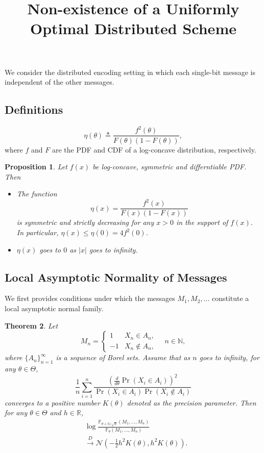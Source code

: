 \documentclass[letterpaper, 10pt]{IEEEtran}      %
\title{\LARGE \bf Non-existence of a Uniformly Optimal Distributed Scheme}
\newtheorem{thm}{\bf{Theorem}}
\newtheorem{prop}[thm]{\bf {Proposition}}
\begin{document}
We consider the distributed encoding setting in which each single-bit message is independent of the other messages. 

\subsection*{Definitions}
\begin{equation} \label{eq:eta_def}
\eta(\theta) \triangleq \frac{f^2(\theta)} {F(\theta)\left(1-F(\theta)\right)},
\end{equation}
where $f$ and $F$ are the PDF and CDF of a log-concave distribution, respectively. 
\begin{prop} \label{prop:eta}
Let $f(x)$ be log-concave, symmetric and differntiable PDF. Then 
\begin{itemize}
\item[(i)] The function
\[
\eta(x) = \frac{f^2(x)}{F(x) \left(1-F(x) \right)}
\]
is symmetric and strictly decreasing for any $x>0$ in the support of $f(x)$. In particular, $
\eta(x) \leq \eta(0) = 4f^2(0)$. 
\item[(ii)] $\eta(x)$ goes to $0$ as $|x|$ goes to infinity. 
\end{itemize}
\end{prop}


\subsection*{Local Asymptotic Normality of Messages}
We first provides conditions under which the messages $M_1,M_2,\ldots$ constitute a local asymptotic normal family. 
\begin{thm} \label{thm:LAN1}
Let 
\[
M_n = \begin{cases} 1 & X_n \in A_n, \\
-1 & X_n \notin A_n,
\end{cases} \quad n\in \mathbb N,
\]
where $\{A_n\}_{n=1}^\infty$ is a sequence of Borel sets. Assume that as $n$ goes to infinity, for any $\theta \in \Theta$,
\begin{equation}
\label{eq:precision_general}
\frac{1}{n} \sum_{i=1}^n \frac{ \left(\frac{d}{d \theta} \Pr(X_i \in A_i) \right)^2 }{ \Pr(X_i \in A_i) \Pr(X_i \notin A_i) }
\end{equation}
converges to a positive number $K(\theta)$ denoted as the \emph{precision parameter}. Then for any $\theta \in \Theta$ and $h\in \mathbb R$,
\begin{align*}
& \log  \frac{ \mathbb P_{\theta+h/\sqrt{n}} (M_1,\ldots,M_n) }{
\mathbb P_{\theta} (M_1,\ldots,M_n)} \\
& \overset{D}{\longrightarrow} \mathcal N\left(-\frac{1}{2} h^2 K(\theta), h^2 K(\theta) \right). 
\end{align*}
\end{thm}
\end{document}
